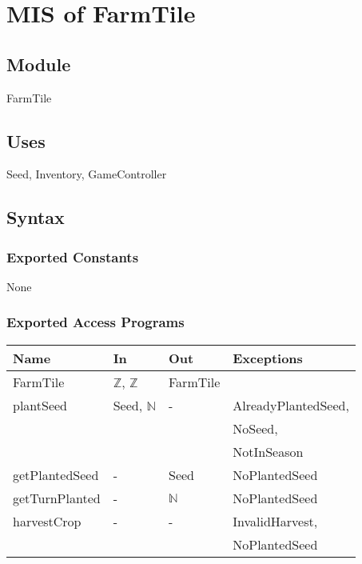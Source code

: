 \documentclass[12pt, titlepage]{article}
\begin{document}
\section{MIS of FarmTile} \label{FarmTile} 

\subsection{Module}

FarmTile

\subsection{Uses}

Seed, Inventory, GameController

\subsection{Syntax}

\subsubsection{Exported Constants}

None

\subsubsection{Exported Access Programs}

\begin{center}
\begin{tabular}{p{4cm} p{4cm} p{4cm} p{4cm}}
\hline
\textbf{Name} & \textbf{In} & \textbf{Out} & \textbf{Exceptions} \\
\hline
FarmTile & $\mathbb{Z}$, $\mathbb{Z}$ & FarmTile &  \\
\hline
plantSeed & Seed, $\mathbb{N}$ & - & AlreadyPlantedSeed, \\&&& NoSeed, \\&&& NotInSeason  \\
\hline
getPlantedSeed & - & Seed & NoPlantedSeed \\
\hline
getTurnPlanted & - & $\mathbb{N}$ & NoPlantedSeed \\
\hline
harvestCrop & - & - & InvalidHarvest, \\&&&NoPlantedSeed \\
\hline
\end{tabular}
\end{center}
\end{document}
